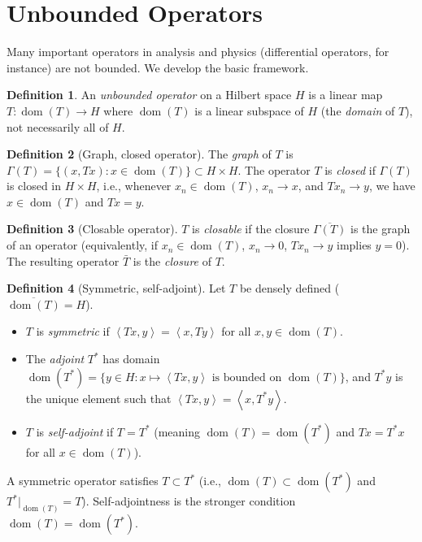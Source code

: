 \documentclass[a4paper,12pt]{book}
\DeclareMathOperator{\dom}{dom}
\newcommand{\inner}[2]{\left\langle #1, #2 \right\rangle}
\theoremstyle{definition}
\newtheorem{definition}{Definition}[chapter]
\theoremstyle{plain}
\theoremstyle{remark}
\begin{document}

\section{Unbounded Operators}\label{sec:unbounded-ops}


Many important operators in analysis and physics (differential operators, for
instance) are not bounded. We develop the basic framework.

\begin{definition}\label{def:unbounded-op}
An \emph{unbounded operator} on a Hilbert space $H$ is a linear map
$T \colon \dom(T) \to H$ where $\dom(T)$ is a linear subspace of $H$
(the \emph{domain} of $T$), not necessarily all of $H$.
\end{definition}

\begin{definition}[Graph, closed operator]\label{def:graph-closed}
The \emph{graph} of $T$ is $\Gamma(T) = \{(x, Tx) : x \in \dom(T)\} \subset H \times H$.
The operator $T$ is \emph{closed} if $\Gamma(T)$ is closed in $H \times H$, i.e.,
whenever $x_n \in \dom(T)$, $x_n \to x$, and $Tx_n \to y$, we have
$x \in \dom(T)$ and $Tx = y$.
\end{definition}

\begin{definition}[Closable operator]\label{def:closable}
$T$ is \emph{closable} if the closure $\overline{\Gamma(T)}$ is the graph of an
operator (equivalently, if $x_n \in \dom(T)$, $x_n \to 0$, $Tx_n \to y$ implies
$y = 0$). The resulting operator $\bar{T}$ is the \emph{closure} of $T$.
\end{definition}

\begin{definition}[Symmetric, self-adjoint]\label{def:sa-unbounded}
Let $T$ be densely defined ($\overline{\dom(T)} = H$).
\begin{itemize}
  \item $T$ is \emph{symmetric} if $\inner{Tx}{y} = \inner{x}{Ty}$ for all
        $x, y \in \dom(T)$.
  \item The \emph{adjoint} $T^*$ has domain
        $\dom(T^*) = \{y \in H : x \mapsto \inner{Tx}{y} \text{ is bounded on } \dom(T)\}$,
        and $T^*y$ is the unique element such that $\inner{Tx}{y} = \inner{x}{T^*y}$.
  \item $T$ is \emph{self-adjoint} if $T = T^*$ (meaning $\dom(T) = \dom(T^*)$
        and $Tx = T^*x$ for all $x \in \dom(T)$).
\end{itemize}
A symmetric operator satisfies $T \subset T^*$ (i.e., $\dom(T) \subset \dom(T^*)$
and $T^*|_{\dom(T)} = T$). Self-adjointness is the stronger condition
$\dom(T) = \dom(T^*)$.
\end{definition}
\end{document}
